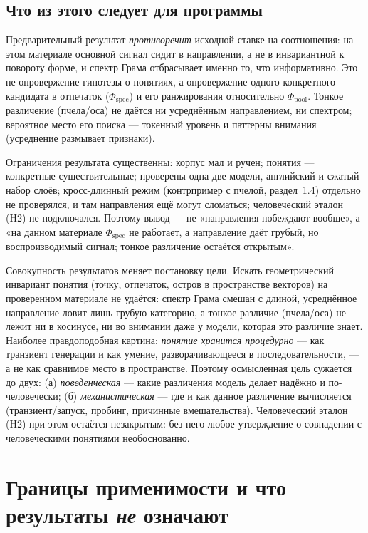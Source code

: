 \documentclass[11pt,a4paper]{article}
\theoremstyle{definition}
\theoremstyle{plain}
\begin{document}
\subsection{Что из этого следует для программы}

Предварительный результат \emph{противоречит} исходной ставке на соотношения: на этом
материале основной сигнал сидит в направлении, а не в инвариантной к повороту форме, и
спектр Грама отбрасывает именно то, что информативно. Это не опровержение гипотезы о
понятиях, а опровержение одного конкретного кандидата в отпечаток
($\Phi_{\mathrm{spec}}$) и его ранжирования относительно $\Phi_{\mathrm{pool}}$. Тонкое
различение (пчела/оса) не даётся ни усреднённым направлением, ни спектром; вероятное
место его поиска — токенный уровень и паттерны внимания (усреднение размывает признаки).

Ограничения результата существенны: корпус мал и ручен; понятия — конкретные
существительные; проверены одна-две модели, английский и сжатый набор слоёв;
кросс-длинный режим (контрпример с пчелой, раздел~1.4) отдельно не проверялся, и там
направления ещё могут сломаться; человеческий эталон (H2) не подключался. Поэтому вывод
— не «направления побеждают вообще», а «на данном материале $\Phi_{\mathrm{spec}}$ не
работает, а направление даёт грубый, но воспроизводимый сигнал; тонкое различение
остаётся открытым».

Совокупность результатов меняет постановку цели. Искать геометрический инвариант понятия
(точку, отпечаток, остров в пространстве векторов) на проверенном материале не удаётся:
спектр Грама смешан с длиной, усреднённое направление ловит лишь грубую категорию, а
тонкое различие (пчела/оса) не лежит ни в косинусе, ни во внимании даже у модели, которая
это различие знает. Наиболее правдоподобная картина: \emph{понятие хранится процедурно} —
как транзиент генерации и как умение, разворачивающееся в последовательности, — а не как
сравнимое место в пространстве. Поэтому осмысленная цель сужается до двух: (а)
\emph{поведенческая} — какие различения модель делает надёжно и по-человечески; (б)
\emph{механистическая} — где и как данное различение вычисляется (транзиент/запуск,
пробинг, причинные вмешательства). Человеческий эталон (H2) при этом остаётся
незакрытым: без него любое утверждение о совпадении с человеческими понятиями
необоснованно.

\section{Границы применимости и что результаты \emph{не} означают}\label{sec:limits}
\end{document}
